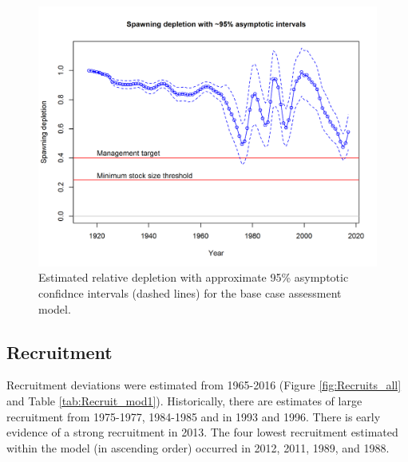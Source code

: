 \documentclass[12pt,]{article}
\begin{document}
\begin{figure}[htbp]
\centering
\includegraphics{r4ss/plots_mod1/ts9_Spawning_depletion_with_95_asymptotic_intervals_intervals.png}
\caption{Estimated relative depletion with approximate 95\% asymptotic
confidnce intervals (dashed lines) for the base case assessment model.
\label{fig:RelDeplete_all}}
\end{figure}

\FloatBarrier

\subsection*{Recruitment}\label{recruitment}

Recruitment deviations were estimated from 1965-2016 (Figure
\ref{fig:Recruits_all} and Table \ref{tab:Recruit_mod1}). Historically,
there are estimates of large recruitment from 1975-1977, 1984-1985 and
in 1993 and 1996. There is early evidence of a strong recruitment in
2013. The four lowest recruitment estimated within the model (in
ascending order) occurred in 2012, 2011, 1989, and 1988.
\end{document}

